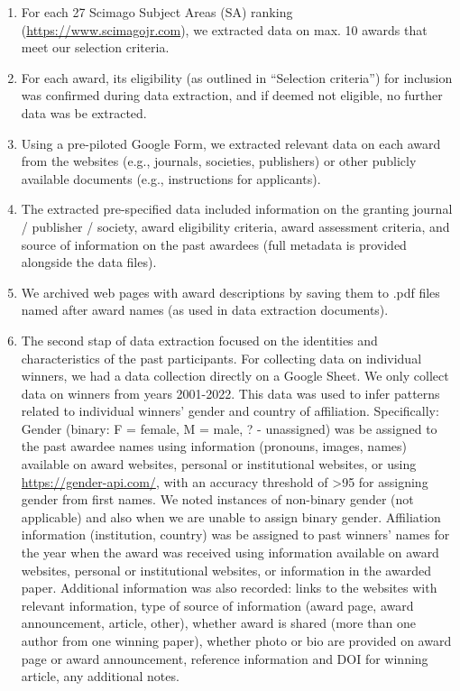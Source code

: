 \documentclass[
]{article}
\begin{document}
\begin{enumerate}
\def\labelenumi{\arabic{enumi}.}
\item
  For each 27 Scimago Subject Areas (SA) ranking
  (\url{https://www.scimagojr.com}), we extracted data on max. 10 awards
  that meet our selection criteria.
\item
  For each award, its eligibility (as outlined in ``Selection
  criteria'') for inclusion was confirmed during data extraction, and if
  deemed not eligible, no further data was be extracted.
\item
  Using a pre-piloted Google Form, we extracted relevant data on each
  award from the websites (e.g., journals, societies, publishers) or
  other publicly available documents (e.g., instructions for
  applicants).
\item
  The extracted pre-specified data included information on the granting
  journal / publisher / society, award eligibility criteria, award
  assessment criteria, and source of information on the past awardees
  (full metadata is provided alongside the data files).
\item
  We archived web pages with award descriptions by saving them to .pdf
  files named after award names (as used in data extraction documents).
\item
  The second stap of data extraction focused on the identities and
  characteristics of the past participants. For collecting data on
  individual winners, we had a data collection directly on a Google
  Sheet. We only collect data on winners from years 2001-2022. This data
  was used to infer patterns related to individual winners' gender and
  country of affiliation. Specifically: Gender (binary: F = female, M =
  male, ? - unassigned) was be assigned to the past awardee names using
  information (pronouns, images, names) available on award websites,
  personal or institutional websites, or using
  \url{https://gender-api.com/}, with an accuracy threshold of
  \textgreater95 for assigning gender from first names. We noted
  instances of non-binary gender (not applicable) and also when we are
  unable to assign binary gender. Affiliation information (institution,
  country) was be assigned to past winners' names for the year when the
  award was received using information available on award websites,
  personal or institutional websites, or information in the awarded
  paper. Additional information was also recorded: links to the websites
  with relevant information, type of source of information (award page,
  award announcement, article, other), whether award is shared (more
  than one author from one winning paper), whether photo or bio are
  provided on award page or award announcement, reference information
  and DOI for winning article, any additional notes.
\end{enumerate}
\end{document}
